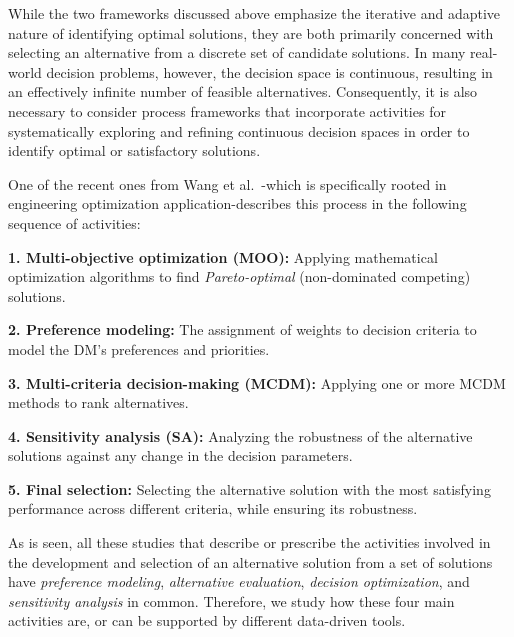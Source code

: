 \documentclass{sfuthesis}
\begin{document}
While the two frameworks discussed above emphasize the iterative and adaptive nature of identifying optimal solutions, they are both primarily concerned with selecting an alternative from a discrete set of candidate solutions. In many real-world decision problems, however, the decision space is continuous, resulting in an effectively infinite number of feasible alternatives. Consequently, it is also necessary to consider process frameworks that incorporate activities for systematically exploring and refining continuous decision spaces in order to identify optimal or satisfactory solutions.\par
One of the recent ones from Wang et al.~\cite{wang2024multi}-which is specifically rooted in engineering optimization application-describes this process in the following sequence of activities:\par
\textbf{1. Multi-objective optimization (MOO):} Applying mathematical optimization algorithms to find \textit{Pareto-optimal} (non-dominated competing) solutions.\par
\textbf{2. Preference modeling:} The assignment of weights to decision criteria to model the DM's preferences and priorities.\par
\textbf{3. Multi-criteria decision-making (MCDM):} Applying one or more MCDM methods to rank alternatives.\par
\textbf{4. Sensitivity analysis (SA):} Analyzing the robustness of the alternative solutions against any change in the decision parameters.\par
\textbf{5. Final selection:} Selecting the alternative solution with the most satisfying performance across different criteria, while ensuring its robustness.\par
As is seen, all these studies that describe or prescribe the activities involved in the development and selection of an alternative solution from a set of solutions have \textit{preference modeling}, \textit{alternative evaluation}, \textit{decision optimization}, and \textit{sensitivity analysis} in common. Therefore, we study how these four main activities are, or can be supported by different data-driven tools.
\end{document}
